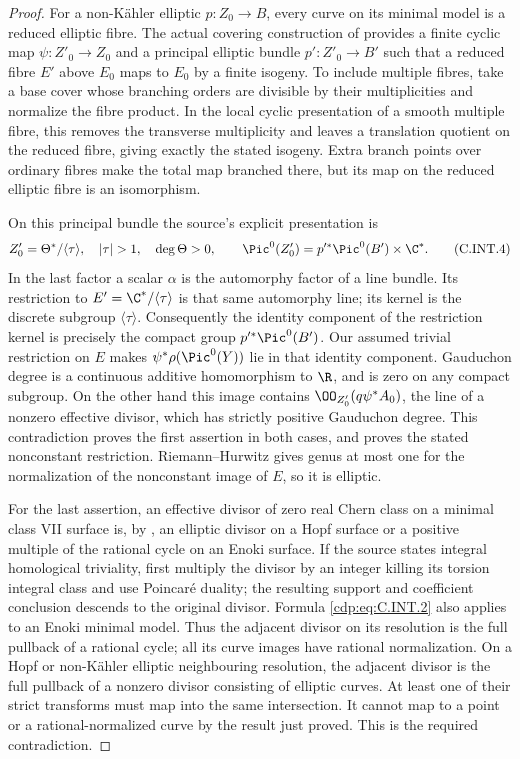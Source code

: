 \begin{proof}
For a non-K\"ahler elliptic $p:Z_0\to B$, every curve
on its minimal model is a reduced elliptic fibre.
The actual covering construction of
\cite[Lemma~2.2 and \S2]{BrinzanescuMoraru2005}
provides a finite cyclic map $\psi:Z'_0\to Z_0$ and a
principal elliptic bundle $p':Z'_0\to B'$ such that a
reduced fibre $E'$ above $E_0$ maps to $E_0$ by a finite
isogeny. To include multiple fibres, take a base cover
whose branching orders are divisible by their
multiplicities and normalize the fibre product. In the
local cyclic presentation of a smooth multiple fibre,
this removes the transverse multiplicity and leaves a
translation quotient on the reduced fibre, giving exactly
the stated isogeny. Extra branch points over ordinary
fibres make the total map branched there, but its map on
the reduced elliptic fibre is an isomorphism.

On this principal bundle the source's explicit
presentation is
\[
 Z'_0=\Theta^*/\langle\tau\rangle,
 \quad |\tau|>1,\quad \deg\Theta>0,
 \qquad
 \Pic^0(Z'_0)=p'^*\Pic^0(B')\times\C^*.
 \tag{C.INT.4}\label{cdp:eq:C.INT.4}
\]
In the last factor a scalar $\alpha$ is the automorphy
factor of a line bundle. Its restriction to
$E'=\C^*/\langle\tau\rangle$ is that same automorphy
line; its kernel is the discrete subgroup
$\langle\tau\rangle$. Consequently the identity
component of the restriction kernel is precisely the
compact group $p'^*\Pic^0(B')$.
Our assumed trivial restriction on $E$ makes
$\psi^*\rho(\Pic^0(Y))$ lie in that identity component.
Gauduchon degree is a continuous additive homomorphism
to $\R$, and is zero on any compact subgroup. On the
other hand this image contains
$\OO_{Z'_0}(q\psi^*A_0)$, the line of a nonzero effective
divisor, which has strictly positive Gauduchon degree.
This contradiction proves the first assertion in both
cases, and proves the stated nonconstant restriction.
Riemann--Hurwitz gives genus at most one for the
normalization of the nonconstant image of $E$, so it is
elliptic.

For the last assertion, an effective divisor of zero
real Chern class on a minimal class VII surface is,
by \cite[Remark~2.7]{DlousskyTeleman2012}, an elliptic
divisor on a Hopf surface or a positive multiple of the
rational cycle on an Enoki surface. If the source states
integral homological triviality, first multiply the
divisor by an integer killing its torsion integral
class and use Poincar\'e duality; the resulting support
and coefficient conclusion descends to the original
divisor. Formula \eqref{cdp:eq:C.INT.2} also applies to an Enoki
minimal model. Thus the adjacent divisor on its
resolution is the full pullback of a rational cycle;
all its curve images have rational normalization.
On a Hopf or non-K\"ahler elliptic neighbouring
resolution, the adjacent divisor is the full pullback
of a nonzero divisor consisting of elliptic curves.
At least one of their strict transforms must map
into the same intersection. It cannot map to a point
or a rational-normalized curve by the result just
proved. This is the required contradiction.
\end{proof}


